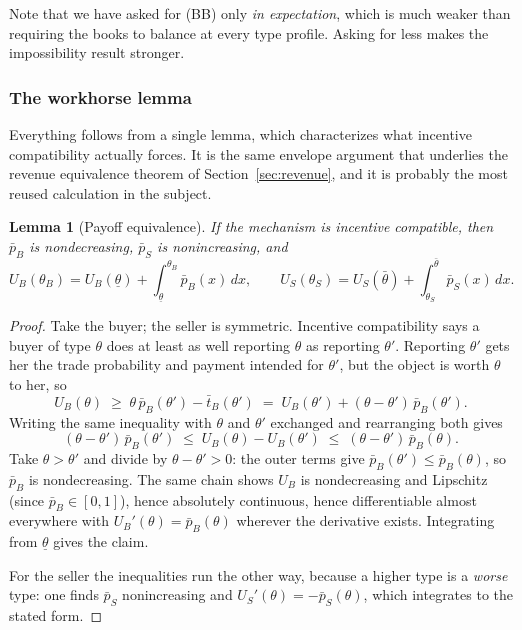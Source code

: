 \documentclass[12pt]{article}
\newtheorem{lemma}[theorem]{Lemma}
\theoremstyle{definition}
\theoremstyle{remark}
\theoremstyle{plain}                          %
\newcommand{\lo}{\underline{\theta}}
\newcommand{\hi}{\bar{\theta}}
\begin{document}
\noindent Note that we have asked for (BB) only \emph{in expectation}, which is much weaker than requiring the books to balance at every type profile. Asking for less makes the impossibility result stronger.
 
\subsubsection{The workhorse lemma}
 
Everything follows from a single lemma, which characterizes what incentive compatibility actually forces. It is the same envelope argument that underlies the revenue equivalence theorem of Section~\ref{sec:revenue}, and it is probably the most reused calculation in the subject.
 
\begin{lemma}[Payoff equivalence]\label{lem:envelope}
If the mechanism is incentive compatible, then $\bar p_B$ is nondecreasing, $\bar p_S$ is nonincreasing, and
\[
    U_B(\theta_B) = U_B(\lo) + \int_{\lo}^{\theta_B} \bar p_B(x)\,dx,
    \qquad
    U_S(\theta_S) = U_S(\hi) + \int_{\theta_S}^{\hi} \bar p_S(x)\,dx.
\]
\end{lemma}
 
\begin{proof}
Take the buyer; the seller is symmetric. Incentive compatibility says a buyer of type $\theta$ does at least as well reporting $\theta$ as reporting $\theta'$. Reporting $\theta'$ gets her the trade probability and payment intended for $\theta'$, but the object is worth $\theta$ to her, so
\[
    U_B(\theta) \;\ge\; \theta\,\bar p_B(\theta') - \bar t_B(\theta')
    \;=\; U_B(\theta') + (\theta - \theta')\,\bar p_B(\theta').
\]
Writing the same inequality with $\theta$ and $\theta'$ exchanged and rearranging both gives
\[
    (\theta - \theta')\,\bar p_B(\theta')
    \;\le\; U_B(\theta) - U_B(\theta')
    \;\le\; (\theta - \theta')\,\bar p_B(\theta).
\]
Take $\theta > \theta'$ and divide by $\theta - \theta' > 0$: the outer terms give $\bar p_B(\theta') \le \bar p_B(\theta)$, so $\bar p_B$ is nondecreasing. The same chain shows $U_B$ is nondecreasing and Lipschitz (since $\bar p_B \in [0,1]$), hence absolutely continuous, hence differentiable almost everywhere with $U_B'(\theta) = \bar p_B(\theta)$ wherever the derivative exists. Integrating from $\lo$ gives the claim.
 
For the seller the inequalities run the other way, because a higher type is a \emph{worse} type: one finds $\bar p_S$ nonincreasing and $U_S'(\theta) = -\bar p_S(\theta)$, which integrates to the stated form.
\end{proof}
 
\end{document}
